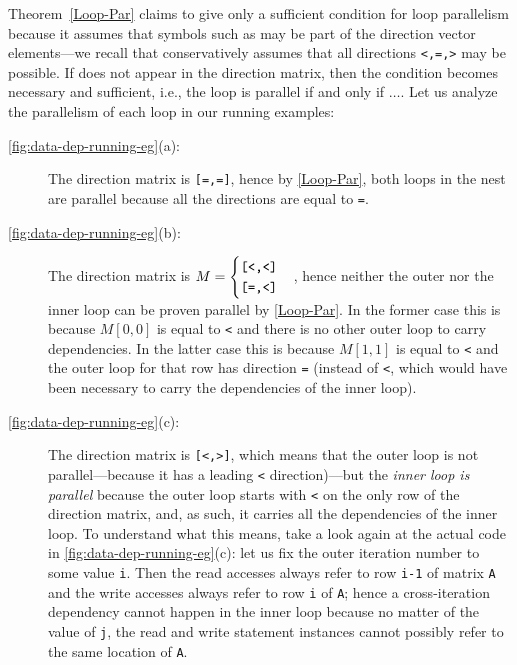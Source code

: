 \documentclass[acmsmall,review]{acmart}\settopmatter{printfolios=true,printccs=false,printacmref=false}
\begin{document}
Theorem~\ref{Loop-Par} claims to give only a sufficient condition for 
loop parallelism because it assumes that symbols such as {\tt *}
may be part of the direction vector elements---we recall that
{\tt *} conservatively assumes that all directions {\tt <,=,>}
may be possible. If {\tt *} does not appear in the direction
matrix, then the condition becomes necessary and sufficient,
i.e., the loop is parallel if and only if $\ldots$.
Let us analyze the parallelism of each loop in our running
examples:
\begin{description}
\item[\cref{fig:data-dep-running-eg}(a):] The direction matrix
        is {\tt [=,=]}, hence by \cref{Loop-Par}, both loops
        in the nest are parallel because all the directions
        are equal to {\tt=}.
\item[\cref{fig:data-dep-running-eg}(b):] The direction matrix is
        $M = \begin{cases}\mbox{\tt[<,<]}\\\mbox{\tt[=,<]}\end{cases}$,
        hence neither the outer nor the inner loop can 
        be proven parallel by \cref{Loop-Par}. In the former case
        this is because $M[0,0]$ is equal to {\tt<} and there is 
        no other outer loop to carry dependencies. In the latter 
        case this is because $M[1,1]$ is equal to {\tt<} and the 
        outer loop for that row has direction 
        {\tt=} (instead of {\tt<}, which would have been necessary 
        to carry the dependencies of the inner loop).
\item[\cref{fig:data-dep-running-eg}(c):] The direction matrix is
        {\tt[<,>]}, which means that the outer loop is not 
        parallel---because it has a leading {\tt<} direction)---but 
        the {\em inner loop is parallel}
        because the outer loop starts with {\tt<} on the only row
        of the direction matrix, and, as such, it carries all the
        dependencies of the inner loop.   To understand what this
        means, take a look again at the actual code in
        \cref{fig:data-dep-running-eg}(c): let us fix the outer
        iteration number to some value {\tt i}. Then the read accesses
        always refer to row {\tt i-1} of matrix {\tt A} and the write 
        accesses always refer to row {\tt i} of {\tt A}; hence a
        cross-iteration dependency cannot happen in the inner loop 
        because no matter of the value of {\tt j}, the read and write
        statement instances cannot possibly refer to the same  
        location of {\tt A}.
\end{description}
\end{document}

